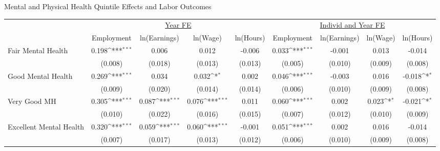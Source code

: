 \def\sym#1{\ifmmode^{#1}\else\(^{#1}\)\fi}
\caption{Mental and Physical Health Quintile Effects and Labor Outcomes}
\footnotesize\begin{tabular}{l*{8}{c}}
                    &\multicolumn{4}{c}{\underline{Year FE}}                                                &\multicolumn{4}{c}{\underline{Individ and Year FE}}                                    \\\cmidrule(lr){2-5}\cmidrule(lr){6-9}
                    &\multicolumn{1}{c}{Employment}&\multicolumn{1}{c}{ln(Earnings)}&\multicolumn{1}{c}{ln(Wage)}&\multicolumn{1}{c}{ln(Hours)}&\multicolumn{1}{c}{Employment}&\multicolumn{1}{c}{ln(Earnings)}&\multicolumn{1}{c}{ln(Wage)}&\multicolumn{1}{c}{ln(Hours)}\\
\hline
Fair Mental Health  &       0.198\sym{***}&       0.006         &       0.012         &      -0.006         &       0.033\sym{***}&      -0.001         &       0.013         &      -0.014         \\
                    &     (0.008)         &     (0.018)         &     (0.013)         &     (0.013)         &     (0.005)         &     (0.010)         &     (0.009)         &     (0.008)         \\
Good Mental Health  &       0.269\sym{***}&       0.034         &       0.032\sym{*}  &       0.002         &       0.046\sym{***}&      -0.003         &       0.016         &      -0.018\sym{*}  \\
                    &     (0.009)         &     (0.020)         &     (0.014)         &     (0.014)         &     (0.006)         &     (0.010)         &     (0.009)         &     (0.008)         \\
Very Good MH        &       0.305\sym{***}&       0.087\sym{***}&       0.076\sym{***}&       0.011         &       0.060\sym{***}&       0.002         &       0.023\sym{*}  &      -0.021\sym{*}  \\
                    &     (0.010)         &     (0.022)         &     (0.016)         &     (0.015)         &     (0.007)         &     (0.012)         &     (0.010)         &     (0.009)         \\
Excellent Mental Health&       0.320\sym{***}&       0.059\sym{***}&       0.060\sym{***}&      -0.001         &       0.051\sym{***}&       0.002         &       0.016         &      -0.014         \\
                    &     (0.007)         &     (0.017)         &     (0.013)         &     (0.012)         &     (0.006)         &     (0.010)         &     (0.009)         &     (0.008)         \\

\end{tabular}
